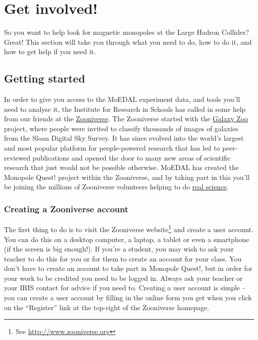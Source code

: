 \section{Get involved!}
\label{sec:getinvolved}
So you want to help look for magnetic monopoles at the Large Hadron Collider?
Great! This section will take you through what you need to do, how to do it,
and how to get help if you need it.

\subsection{Getting started}
\label{sec:zooniversegettingstarted}
In order to give you access to the MoEDAL experiment data,
and tools you'll need to analyse it, the Institute for Research in Schools
has called in some help from our friends at the
\href{http://www.zooniverse.org}{Zooniverse}.
The Zooniverse started with the
\href{http://www.galaxyzoo.org}{Galaxy Zoo} project,
where people were invited to classify thousands of images of galaxies from
the Sloan Digital Sky Survey.
It has since evolved into the world's largest and most popular platform
for people-powered research that has led to peer-reviewed publications
and opened the door to many new areas of scientific research that just
would not be possible otherwise.
MoEDAL has created the Monopole Quest! project within the Zooniverse,
and by taking part in this you'll be joining the millions of Zooniverse
volunteers helping to do
\href{https://www.zooniverse.org/about/publications}{real science}.

\subsubsection{Creating a Zooniverse account}
\label{sec:zooniverseaccount}
The first thing to do is to visit the Zooniverse website\footnote{%
See \href{http://www.zooniverse.org}{http://www.zooniverse.org}}
and create a user account.
%
You can do this on a desktop computer, a laptop, a tablet or even a
smartphone (if the screen is big enough!).
If you're a student, you may wish to ask your teacher to do this for you
or for them to create an account for your class.
You don't have to create an account to take part in Monopole Quest!,
but in order for your work to be credited you need to be logged in.
Always ask your teacher or your IRIS contact for advice if you need to.
Creating a user account is simple -- you can create a user account by
filling in the online form you get when you click on the ``Register''
link at the top-right of the Zooniverse homepage.

